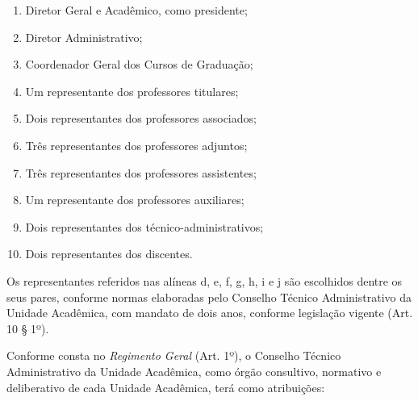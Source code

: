 \documentclass[
	12pt,				%
	openright,			%
  oneside,     %
	a4paper,			%
	chapter=TITLE,		%
	english,			%
	french,				%
	spanish,			%
	brazil				%
	]{abntex2}
\begin{document}
\begin{enumerate}
    \item Diretor Geral e Acadêmico, como presidente;
    \item Diretor Administrativo; 	
    \item Coordenador Geral dos Cursos de Graduação; 	
    \item Um representante dos professores titulares;
    \item Dois representantes dos professores associados;	
    \item Três representantes dos professores adjuntos; 	
    \item Três representantes dos professores assistentes; 	
    \item Um representante dos professores auxiliares; 	
    \item Dois representantes dos técnico-administrativos; 	
    \item Dois representantes dos discentes.
\end{enumerate}

Os representantes referidos nas alíneas d, e, f, g, h, i e j são escolhidos dentre os seus pares, conforme normas elaboradas pelo Conselho Técnico Administrativo da Unidade Acadêmica, com mandato de dois anos, conforme legislação vigente (Art. 10 § 1º).

Conforme consta no \textit{Regimento Geral} (Art. 1º), o Conselho Técnico Administrativo da Unidade Acadêmica, como órgão consultivo, normativo e deliberativo de cada Unidade Acadêmica, terá como atribuições:
\end{document}
